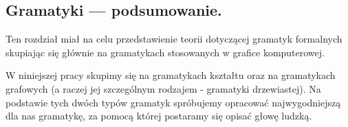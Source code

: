 \subsection{Gramatyki --- podsumowanie.}
Ten rozdział miał na celu przedstawienie teorii dotyczącej gramatyk formalnych
skupiając się głównie na gramatykach stosowanych w grafice komputerowej.

W niniejszej pracy skupimy się na gramatykach kształtu oraz na gramatykach
grafowych (a raczej jej szczególnym rodzajem - gramatyki drzewiastej). Na
podstawie tych dwóch typów gramatyk spróbujemy opracować najwygodniejszą dla nas
gramatykę, za pomocą której postaramy się opisać głowę ludzką.
